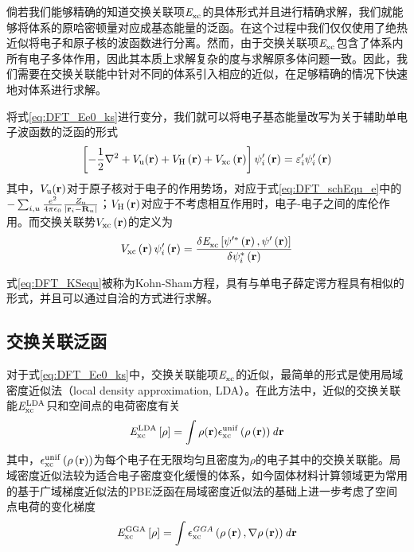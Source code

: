 倘若我们能够精确的知道交换关联项$\it E_{\rm xc}^{\rm } \it$的具体形式并且进行精确求解，我们就能够将体系的原哈密顿量对应成基态能量的泛函。在这个过程中我们仅仅使用了绝热近似将电子和原子核的波函数进行分离。然而，由于交换关联项$\it E_{\rm xc}^{\rm } \it$包含了体系内所有电子多体作用，因此其本质上求解复杂的度与求解原多体问题一致。因此，我们需要在交换关联能中针对不同的体系引入相应的近似，在足够精确的情况下快速地对体系进行求解。

将式\ref{eq:DFT_Ee0_ks}进行变分，我们就可以将电子基态能量改写为关于辅助单电子波函数的泛函的形式\chinesecolon
\begin{equation}
    \label{eq:DFT_KSequ}
    \left[-\frac{1}{2}\nabla^2+V_{\rm u}({\mathbf r})+V_{\rm H}\left({\mathbf r}\right)+V_{\rm xc}\left({\mathbf r}\right)\right]\psi'_i\left({\mathbf r}\right)=\varepsilon'_i\psi'_i\left({\mathbf r}\right) 
\end{equation}
其中，$V_{\rm u}({\mathbf r})$对于原子核对于电子的作用势场，对应于式\ref{eq:DFT_schEqu_e}中的$-\sum_{i,u}\frac{e^2}{4\pi\epsilon_0}\frac{Z_{\rm u}}{\left\lvert{\mathbf r}_i - {\mathbf R}_u\right\rvert}$；$V_{\rm H}\left({\mathbf r}\right)$对应于不考虑相互作用时，电子-电子之间的库伦作用。而交换关联势$V_{\rm xc}\left({\mathbf r}\right)$的定义为\chinesecolon
\[
    V_{\rm xc}\left({\mathbf r}\right)\psi'_i\left({\mathbf r}\right)=\frac{\delta \it E_{\rm xc}^{\rm } \it\left[\psi'^*\left({\mathbf r}\right),\psi'\left({\mathbf r}\right)\right]}{\delta \psi_i^*\left({\mathbf r}\right)}
\]

式\ref{eq:DFT_KSequ}被称为Kohn-Sham方程，具有与单电子薛定谔方程具有相似的形式，并且可以通过自洽的方式进行求解。

\subsection{交换关联泛函}

对于式\ref{eq:DFT_Ee0_ks}中，交换关联能项$\it E_{\rm xc}^{\rm } \it$的近似，最简单的形式是使用局域密度近似法（local density approximation, LDA）。在此方法中，近似的交换关联能$\it E_{\rm xc}^{\rm LDA} \it$只和空间点的电荷密度有关\chinesecolon
\begin{equation}
    \label{eq:DFT_LDA}
    \it E_{\rm xc}^{\rm LDA} \it\left[\rho\right]=\int \rho({\mathbf r}) \epsilon_{\rm xc}^{\rm unif} \left(\rho\left({\mathbf r}\right)\right) d{\mathbf r}
\end{equation}
其中，$\epsilon_{\rm xc}^{\rm unif}\left(\rho\left({\mathbf r}\right)\right)$为每个电子在无限均匀且密度为$\rho$的电子其中的交换关联能。局域密度近似法较为适合电子密度变化缓慢的体系，如今固体材料计算领域更为常用的基于广域梯度近似法的PBE泛函在局域密度近似法的基础上进一步考虑了空间点电荷的变化梯度\chinesecolon
\begin{equation}
    \it E_{\rm xc}^{\rm GGA} \it\left[\rho\right]=\int\epsilon_{\rm xc}^{GGA}\left(\rho\left({\mathbf r}\right),\nabla\rho\left({\mathbf r}\right)\right)d{\mathbf r}
\end{equation}


